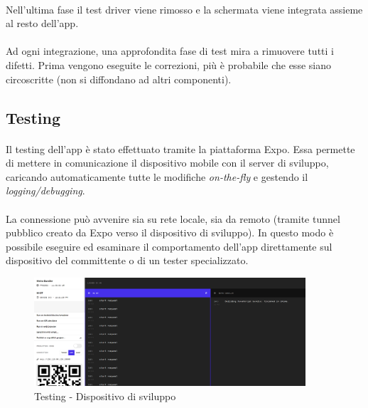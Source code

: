\documentclass[11pt,a4paper,english]{article}
\begin{document}
\paragraph{} Nell'ultima fase il test driver viene rimosso e la schermata viene integrata assieme al resto dell'app. 

\paragraph{} Ad ogni integrazione, una approfondita fase di test mira a rimuovere tutti i difetti. Prima vengono eseguite le correzioni, più è probabile che esse siano circoscritte (non si diffondano ad altri componenti).

\subsection{Testing}

\paragraph{} Il testing dell'app è stato effettuato tramite la piattaforma Expo. Essa permette di mettere in comunicazione il dispositivo mobile con il server di sviluppo, caricando automaticamente tutte le modifiche \emph{on-the-fly} e gestendo il \emph{logging/debugging}.

\paragraph{} La connessione può avvenire sia su rete locale, sia da remoto (tramite tunnel pubblico creato da Expo verso il dispositivo di sviluppo). In questo modo è possibile eseguire ed esaminare il comportamento dell'app direttamente sul dispositivo del committente o di un tester specializzato.  

\begin{figure}[H]
    \centering
    \includegraphics[width=0.9\textwidth]{img/debug_app_pc.png}
    \caption{Testing - Dispositivo di sviluppo}
\end{figure}
\end{document}
